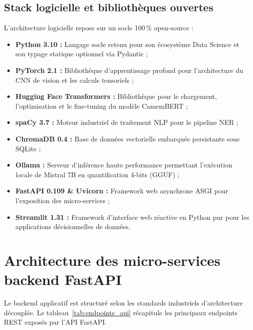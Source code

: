 \documentclass[12pt,a4paper]{report}
\begin{document}
\subsection{Stack logicielle et bibliothèques ouvertes}
L'architecture logicielle repose sur un socle 100\,\% open-source :
\begin{itemize}
    \item \textbf{Python 3.10 :} Langage socle retenu pour son écosystème Data Science et son typage statique optionnel via Pydantic ;
    \item \textbf{PyTorch 2.1 :} Bibliothèque d'apprentissage profond pour l'architecture du CNN de vision et les calculs tensoriels ;
    \item \textbf{Hugging Face Transformers :} Bibliothèque pour le chargement, l'optimisation et le fine-tuning du modèle CamemBERT ;
    \item \textbf{spaCy 3.7 :} Moteur industriel de traitement NLP pour le pipeline NER ;
    \item \textbf{ChromaDB 0.4 :} Base de données vectorielle embarquée persistante sous SQLite ;
    \item \textbf{Ollama :} Serveur d'inférence haute performance permettant l'exécution locale de Mistral 7B en quantification 4-bits (GGUF) ;
    \item \textbf{FastAPI 0.109 \& Uvicorn :} Framework web asynchrone ASGI pour l'exposition des micro-services ;
    \item \textbf{Streamlit 1.31 :} Framework d'interface web réactive en Python pur pour les applications décisionnelles de données.
\end{itemize}

\section{Architecture des micro-services backend FastAPI}
Le backend applicatif est structuré selon les standards industriels d'architecture découplée. Le tableau~\ref{tab:endpoints_api} récapitule les principaux endpoints REST exposés par l'API FastAPI.
\end{document}
